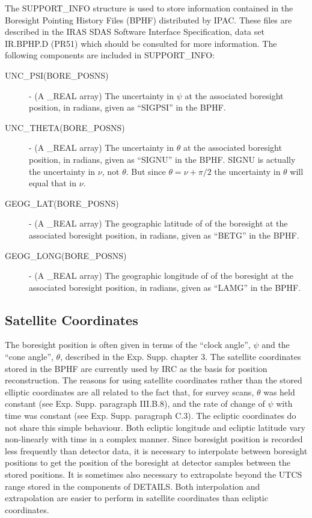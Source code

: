 The SUPPORT\_INFO structure is used to store information contained in the
Boresight Pointing History Files (BPHF) distributed by IPAC. These files are
described in the IRAS SDAS Software Interface Specification, data set IR.BPHP.D
(PR51) which should be consulted for more information. The following components
are included in SUPPORT\_INFO:

\begin{description}

\item [UNC\_PSI(BORE\_POSNS)] - (A \_REAL array) The uncertainty in $\psi$ at
the associated boresight position, in radians, given as ``SIGPSI'' in the BPHF.

\item [UNC\_THETA(BORE\_POSNS)] - (A \_REAL array) The uncertainty in $\theta$
at the associated boresight position, in radians, given as ``SIGNU'' in the
BPHF. SIGNU is actually the uncertainty in $\nu$, not $\theta$. But since
$\theta = \nu + \pi/2$ the uncertainty in $\theta$ will equal that in $\nu$.

\item [GEOG\_LAT(BORE\_POSNS)] -  (A \_REAL array) The geographic latitude of
of the boresight at the associated boresight position, in radians, given as
``BETG'' in the BPHF.

\item [GEOG\_LONG(BORE\_POSNS)] -  (A \_REAL array) The geographic longitude of
of the boresight at the associated boresight position, in radians, given as
``LAMG'' in the BPHF.

\end {description}

\subsection{Satellite Coordinates}
The boresight position is often given in terms of the ``clock angle'', $\psi$
and the ``cone angle'', $\theta$, described in the Exp. Supp. chapter 3. The
satellite coordinates stored in the BPHF are currently used by IRC as the basis
for position reconstruction. The reasons for using satellite coordinates rather
than the stored elliptic coordinates are all related to the fact that, for
survey scans, $\theta$ was held constant (see Exp. Supp. paragraph III.B.8), and
the rate of change of $\psi$ with time was constant (see Exp. Supp. paragraph
C.3). The ecliptic coordinates do not share this simple behaviour. Both ecliptic
longitude and ecliptic latitude vary non-linearly with time in a complex manner.
Since boresight position is recorded less frequently than detector data, it is
necessary to interpolate between boresight positions to get the position of the
boresight at detector samples between the stored positions. It is sometimes also
necessary to extrapolate beyond the UTCS range stored in the components of
DETAILS. Both interpolation and extrapolation are easier to perform in
satellite coordinates than ecliptic coordinates.

